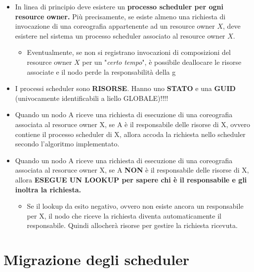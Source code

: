 \documentclass[10pt,a4paper]{report}
\begin{document}
\begin{itemize}
\item In linea di principio deve esistere un \textbf{processo scheduler per ogni resource owner.} Più precisamente, se esiste almeno una richiesta di invocazione di una coreografia appartenente ad un resource owner $X$, deve esistere nel sistema un processo scheduler associato al resource owner $X$.

\begin{itemize}
\item Eventualmente, se non si registrano invocazioni di composizioni del resource owner $X$ per un "\textit{certo tempo}", è possibile deallocare le risorse associate e il nodo perde la responsabilità della g
\end{itemize}

\item I processi scheduler sono \textbf{RISORSE}. Hanno uno \textbf{STATO} e una \textbf{GUID} (univocamente identificabili a liello GLOBALE)!!!!

\item Quando un nodo A riceve una richiesta di esecuzione di una coreografia associata al resoruce owner X, se A è il responsabile delle risorse di X, ovvero contiene il processo scheduler di X, allora accoda la richiesta nello scheduler secondo l'algoritmo implementato.

\item Quando un nodo A riceve una richiesta di esecuzione di una coreografia associata al resoruce owner X, se A \textbf{NON} è il responsabile delle risorse di X, allora \textbf{ESEGUE UN LOOKUP per sapere chi è il responsabile e gli inoltra la richiesta.}

\begin{itemize}
\item Se il lookup da esito negativo, ovvero non esiste ancora un responsabile per X, il nodo che riceve la richiesta diventa automaticamente il responsabile. Quindi allocherà risorse per gestire la richiesta ricevuta.
\end{itemize}

\end{itemize}

\section{Migrazione degli scheduler}
\end{document}
